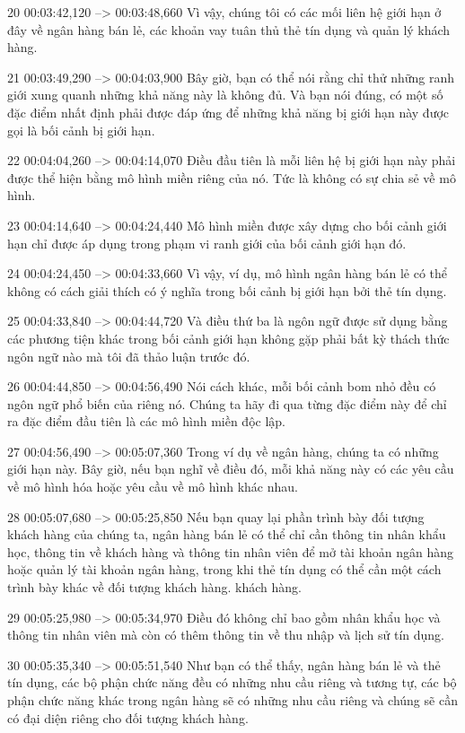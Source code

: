 20
00:03:42,120 --> 00:03:48,660
Vì vậy, chúng tôi có các mối liên hệ giới hạn ở đây về ngân hàng bán lẻ, các khoản vay tuân thủ thẻ tín dụng và quản lý khách hàng.

21
00:03:49,290 --> 00:04:03,900
Bây giờ, bạn có thể nói rằng chỉ thử những ranh giới xung quanh những khả năng này là không đủ.  Và bạn nói đúng, có một số đặc điểm nhất định phải được đáp ứng để những khả năng bị giới hạn này được gọi là bối cảnh bị giới hạn.

22
00:04:04,260 --> 00:04:14,070
Điều đầu tiên là mỗi liên hệ bị giới hạn này phải được thể hiện bằng mô hình miền riêng của nó.  Tức là không có sự chia sẻ về mô hình.

23
00:04:14,640 --> 00:04:24,440
Mô hình miền được xây dựng cho bối cảnh giới hạn chỉ được áp dụng trong phạm vi ranh giới của bối cảnh giới hạn đó.

24
00:04:24,450 --> 00:04:33,660
Vì vậy, ví dụ, mô hình ngân hàng bán lẻ có thể không có cách giải thích có ý nghĩa trong bối cảnh bị giới hạn bởi thẻ tín dụng.

25
00:04:33,840 --> 00:04:44,720
Và điều thứ ba là ngôn ngữ được sử dụng bằng các phương tiện khác trong bối cảnh giới hạn không gặp phải bất kỳ thách thức ngôn ngữ nào mà tôi đã thảo luận trước đó.

26
00:04:44,850 --> 00:04:56,490
Nói cách khác, mỗi bối cảnh bom nhỏ đều có ngôn ngữ phổ biến của riêng nó.  Chúng ta hãy đi qua từng đặc điểm này để chỉ ra đặc điểm đầu tiên là các mô hình miền độc lập.

27
00:04:56,490 --> 00:05:07,360
Trong ví dụ về ngân hàng, chúng ta có những giới hạn này.  Bây giờ, nếu bạn nghĩ về điều đó, mỗi khả năng này có các yêu cầu về mô hình hóa hoặc yêu cầu về mô hình khác nhau.

28
00:05:07,680 --> 00:05:25,850
Nếu bạn quay lại phần trình bày đối tượng khách hàng của chúng ta, ngân hàng bán lẻ có thể chỉ cần thông tin nhân khẩu học, thông tin về khách hàng và thông tin nhân viên để mở tài khoản ngân hàng hoặc quản lý tài khoản ngân hàng, trong khi thẻ tín dụng có thể cần một cách trình bày khác về đối tượng khách hàng.  khách hàng.

29
00:05:25,980 --> 00:05:34,970
Điều đó không chỉ bao gồm nhân khẩu học và thông tin nhân viên mà còn có thêm thông tin về thu nhập và lịch sử tín dụng.

30
00:05:35,340 --> 00:05:51,540
Như bạn có thể thấy, ngân hàng bán lẻ và thẻ tín dụng, các bộ phận chức năng đều có những nhu cầu riêng và tương tự, các bộ phận chức năng khác trong ngân hàng sẽ có những nhu cầu riêng và chúng sẽ cần có đại diện riêng cho đối tượng khách hàng.

